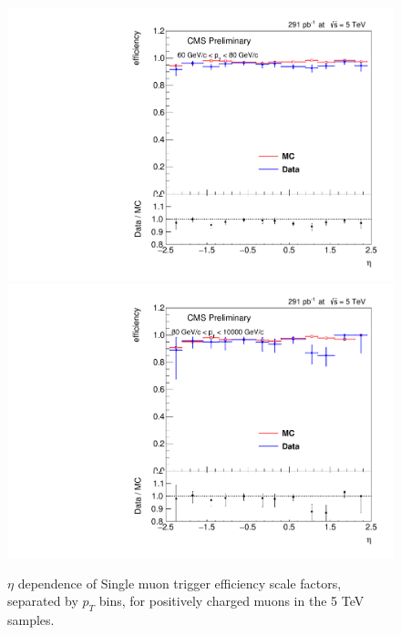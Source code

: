 \begin{figure}
\includegraphics[width=0.48\linewidth]{plots/efficiency/5_zmmhlt_positive/PtBins_eta_pt10.pdf}
\includegraphics[width=0.48\linewidth]{plots/efficiency/5_zmmhlt_positive/PtBins_eta_pt11.pdf}
\caption{$\eta$ dependence of Single muon trigger efficiency scale factors, separated by $p_T$ bins, for positively charged muons in the 5 TeV samples.}
\label{fig:Eff:mu:5:HLT:pos}
\end{figure}
